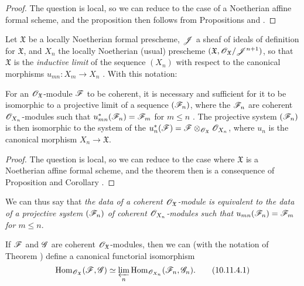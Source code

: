 \begin{proof}
\label{proof-1.10.11.1}
The question is local, so we can reduce to the case of a Noetherian affine formal scheme, and the proposition then follows from Propositions  and .
\end{proof}

\begin{env}[10.11.2]
\label{1.10.11.2}
Let $\mathfrak{X}$ be a locally Noetherian formal prescheme, $\mathscr{J}$ a sheaf of ideals of definition for $\mathfrak{X}$, and $X_n$ the locally Noetherian (usual) prescheme $(\mathfrak{X},\mathscr{O}_\mathfrak{X}/\mathscr{J}^{n+1})$, so that $\mathfrak{X}$ is the \emph{inductive limit} of the sequence $(X_n)$ with respect to the canonical morphisms $u_{mn}:X_m\to X_n$ .
With this notation:
\end{env}

\begin{theorem}[10.11.3]
\label{1.10.11.3}
For an $\mathscr{O}_\mathfrak{X}$-module $\mathscr{F}$ to be coherent, it is necessary and sufficient for it to be isomorphic to a projective limit of a sequence $(\mathscr{F}_n)$, where the $\mathscr{F}_n$ are coherent $\mathscr{O}_{X_n}$-modules such that $u_{mn}^*(\mathscr{F}_n)=\mathscr{F}_m$ for $m\leq n$ .
The projective system $(\mathscr{F}_n)$ is then isomorphic to the system of the $u_n^*(\mathscr{F})=\mathscr{F}\otimes_{\mathscr{O}_\mathfrak{X}}\mathscr{O}_{X_n}$, where $u_n$ is the canonical morphism $X_n\to\mathfrak{X}$.
\end{theorem}

\begin{proof}
\label{proof-1.10.11.3}
The question is local, so we can reduce to the case where $\mathfrak{X}$ is a Noetherian affine formal scheme, and the theorem then is a consequence of Proposition  and Corollary .
\end{proof}

We can thus say that \emph{the data of a coherent $\mathscr{O}_\mathfrak{X}$-module is equivalent to the data of a projective system $(\mathscr{F}_n)$ of coherent $\mathscr{O}_{X_n}$-modules such that $u_{mn}(\mathscr{F}_n)=\mathscr{F}_m$ for $m\leq n$}.

\begin{corollary}[10.11.4]
\label{1.10.11.4}
If $\mathscr{F}$ and $\mathscr{G}$ are coherent $\mathscr{O}_\mathfrak{X}$-modules, then we can (with the notation of Theorem ) define a canonical functorial isomorphism
\begin{equation*}
\label{1.10.11.4.1}
  \operatorname{Hom}_{\mathscr{O}_\mathfrak{X}}(\mathscr{F},\mathscr{G})\simeq\varprojlim_n\operatorname{Hom}_{\mathscr{O}_{X_n}}(\mathscr{F}_n,\mathscr{G}_n).
  \tag{10.11.4.1}
\end{equation*}
\end{corollary}

